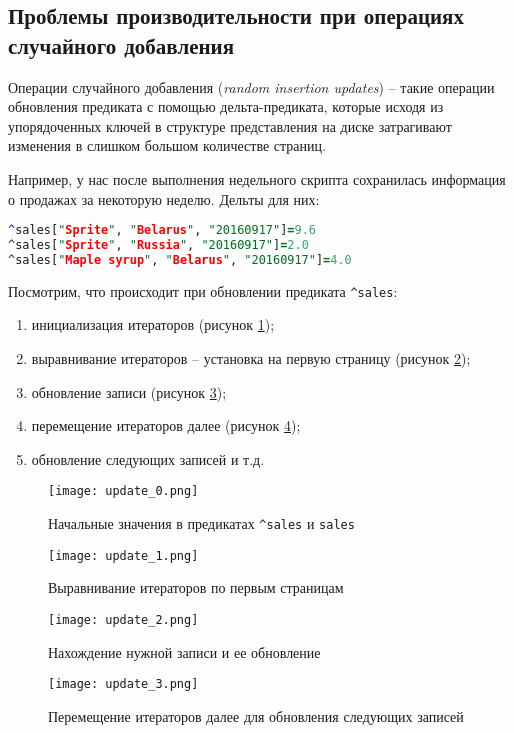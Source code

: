 \subsection{Проблемы производительности при операциях случайного добавления}
\label{sec:optimization:random_updates}

Операции случайного добавления (\emph{random insertion updates}) – такие операции обновления предиката с помощью дельта-предиката, которые исходя из упорядоченных ключей в структуре представления на диске затрагивают изменения в слишком большом количестве страниц.

Например, у нас после выполнения недельного скрипта сохранилась информация о продажах за некоторую неделю. Дельты для них:

\begin{lstlisting}[language=Prolog]
^sales["Sprite", "Belarus", "20160917"]=9.6
^sales["Sprite", "Russia", "20160917"]=2.0
^sales["Maple syrup", "Belarus", "20160917"]=4.0
\end{lstlisting}

Посмотрим, что происходит при обновлении предиката \lstinline{^sales}:

\begin{enumerate}
  \item инициализация итераторов (рисунок \ref{fig:optimization:random_updates:iter_init});
  \item выравнивание итераторов – установка на первую страницу (рисунок \ref{fig:optimization:random_updates:iter_align_first});
  \item обновление записи (рисунок \ref{fig:optimization:random_updates:iter_update_fact});
  \item перемещение итераторов далее (рисунок \ref{fig:optimization:random_updates:iter_advance});
  \item обновление следующих записей и т.д.
\end{enumerate}

\begin{figure}
	\centering
	\texttt{[image: update\_0.png]}
	\caption{Начальные значения в предикатах \lstinline{^sales} и \lstinline{sales}}
	\label{fig:optimization:random_updates:iter_init}
\end{figure}
\begin{figure}
	\centering
	\texttt{[image: update\_1.png]}
	\caption{Выравнивание итераторов по первым страницам}
	\label{fig:optimization:random_updates:iter_align_first}
\end{figure}
\begin{figure}
	\centering
	\texttt{[image: update\_2.png]}
	\caption{Нахождение нужной записи и ее обновление}
	\label{fig:optimization:random_updates:iter_update_fact}
\end{figure}
\begin{figure}
	\centering
	\texttt{[image: update\_3.png]}
	\caption{Перемещение итераторов далее для обновления следующих записей}
	\label{fig:optimization:random_updates:iter_advance}
\end{figure}

